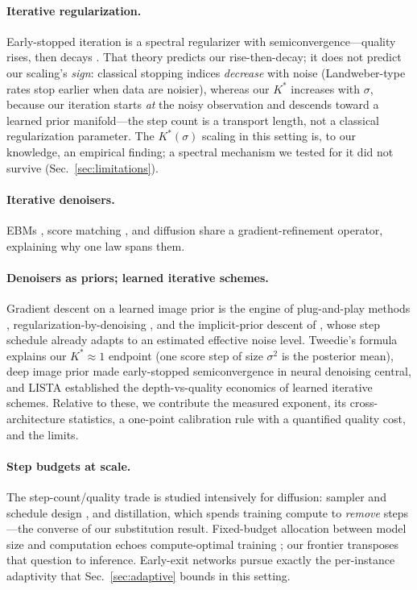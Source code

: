 \documentclass[letterpaper]{article}
\begin{document}
\paragraph{Iterative regularization.} Early-stopped iteration is a spectral regularizer with
semiconvergence---quality rises, then decays
\citep{landweber1951,engl1996,hansen2010,yao2007,raskutti2014}. That theory predicts our rise-then-decay;
it does not predict our scaling's \emph{sign}: classical stopping indices \emph{decrease} with noise
(Landweber-type rates stop earlier when data are noisier), whereas our $K^{*}$ increases with $\sigma$,
because our iteration starts \emph{at} the noisy observation and descends toward a learned prior
manifold---the step count is a transport length, not a classical regularization parameter. The
$K^{*}(\sigma)$ scaling in this setting is, to our knowledge, an empirical finding; a spectral mechanism
we tested for it did not survive (Sec.~\ref{sec:limitations}).
\paragraph{Iterative denoisers.} EBMs \citep{lecun2006,du2019}, score matching \citep{song2019}, and
diffusion \citep{ho2020,song2021} share a gradient-refinement operator, explaining why one law spans them.
\paragraph{Denoisers as priors; learned iterative schemes.} Gradient descent on a learned image prior is
the engine of plug-and-play methods \citep{venkatakrishnan2013}, regularization-by-denoising
\citep{romano2017}, and the implicit-prior descent of \citet{kadkhodaie2021}, whose step schedule already
adapts to an estimated effective noise level. Tweedie's formula \citep{efron2011} explains our
$K^{*}{\approx}1$ endpoint (one score step of size $\sigma^{2}$ is the posterior mean), deep image prior
\citep{ulyanov2018} made early-stopped semiconvergence in neural denoising central, and LISTA
\citep{gregor2010} established the depth-vs-quality economics of learned iterative schemes. Relative to
these, we contribute the measured exponent, its cross-architecture statistics, a one-point calibration
rule with a quantified quality cost, and the limits.
\paragraph{Step budgets at scale.} The step-count/quality trade is studied intensively for diffusion:
sampler and schedule design \citep{songddim2021,karras2022,lu2022}, and distillation, which spends
training compute to \emph{remove} steps \citep{salimans2022,songcm2023}---the converse of our
substitution result. Fixed-budget allocation between model size and computation echoes compute-optimal
training \citep{kaplan2020,hoffmann2022}; our frontier transposes that question to inference. Early-exit
networks \citep{teerapittayanon2016} pursue exactly the per-instance adaptivity that
Sec.~\ref{sec:adaptive} bounds in this setting.
\end{document}

